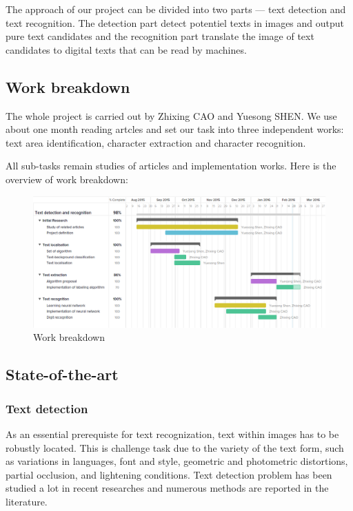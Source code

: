 \documentclass[paper=a4, french, 11pt]{scrartcl}
\begin{document}
The approach of our project can be divided into two parts --- text detection and text recognition. The detection part detect potentiel texts in images and output pure text candidates and the recognition part translate the image of text candidates to digital texts that can be read by machines.

\subsection{Work breakdown}
The whole project is carried out by Zhixing CAO and Yuesong SHEN. We use about one month reading artcles and set our task into three independent works: text area identification, character extraction and character recognition.

All sub-tasks remain studies of articles and implementation works. Here is the overview of work breakdown:

\begin{figure}[h]
\begin{center}
   \includegraphics[width=0.8\linewidth]{breakdowns.png}
\end{center}
\vspace{-4ex}
\caption{Work breakdown}
\label{fig:heatmap}
\end{figure}

\subsection{State-of-the-art}
\subsubsection{Text detection}
As an essential prerequiste for text recognization, text within images has to be robustly located. This is challenge task due to the variety of the text form, such as variations in languages, font and style, geometric and photometric distortions, partial occlusion, and lightening conditions. Text detection problem has been studied a lot in recent researches and numerous methods are reported in the literature.
\end{document}
